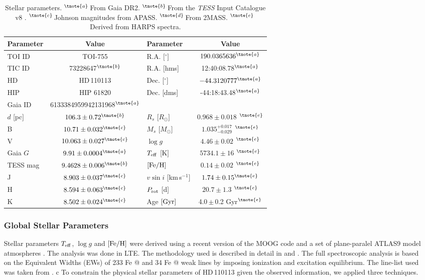 \documentclass[fleqn,usenatbib]{mnras}
\makeatletter
\newcommand*{\rom}[1]{\expandafter\@slowromancap\romannumeral #1@}
\newcommand{\tess}{{\it TESS}}
\newcommand{\harps}{{HARPS}}
\newcommand{\kms}{km\,s$^{-1}$}
\newcommand{\msun}{\mbox{$M_{\odot}$}}
\newcommand{\rsun}{\mbox{$R_{\odot}$}}
\newcommand{\vsini}{$v\sin{i}$}
\newcommand{\teff}{$T_{\rm eff}$}
\newcommand{\feh}{\mbox{$\rm [Fe/H]$}}
\newcommand{\logg}{$\log g$}
\newcommand{\Tlogg}{ $ 4.46 \pm 0.02 $ }
\newcommand{\TFeH}{ $ 0.14 \pm 0.02 $ }
\newcommand{\TTeff}{ $ 5734.1 \pm 16 $ }
\newcommand{\Tmassiso}{ $ 1.035^{+0.017}_{-0.029} $ }
\newcommand{\Trstar}{ $ 0.968 \pm 0.018 $ }
\newcommand{\Tperiod}{ $ 20.7 \pm 1.3 $ }
\newcommand{\TTstar}{TOI-755}
\newcommand{\Tstar}{HD\,110113}
\newcommand{\Tstarage}{4.0\,$\pm$\,0.2 Gyr}
\newcommand{\TGAIAid}{6133384959942131968}
\makeatother
\begin{document}
\begin{table}
    \centering
    \begin{tabular}{lc|lc}
        \hline
        \hline
        Parameter & Value & Parameter & Value \\
        \hline
        \hline
        TOI ID & \TTstar & R.A. [$^{\circ}$] & $190.0365636^{\tnote{a}}$ \\
        TIC ID & 73228647$^{\tnote{b}}$ & R.A. [hms] & 12:40:08.78$^{\tnote{a}}$ \\
        HD & \Tstar & Dec. [$^{\circ}$] & $-44.3120777^{\tnote{a}}$\\
        HIP & HIP 61820 & Dec. [dms] & -44:18:43.48$^{\tnote{a}}$ \\
        Gaia ID & {\scriptsize \TGAIAid}$^{\tnote{a}}$ & & \\
        $d$ [pc] & $ 106.3\pm0.72^{\tnote{b}}$ & $R_s$ [\rsun{}] & \Trstar{}$^{\tnote{e}}$ \\
        B & $10.71\pm0.032^{\tnote{c}}$ & $M_s$ [\msun{}] & \Tmassiso{}$^{\tnote{e}}$ \\
        V & $10.063\pm0.027^{\tnote{c}}$ &  \logg{} & \Tlogg{}$^{\tnote{e}}$ \\
        Gaia $G$ & $9.91\pm0.0004 ^{\tnote{a}}$ & \teff{} [K] & \TTeff{}$^{\tnote{e}}$ \\
        TESS mag & $9.4628\pm0.006^{\tnote{b}}$ & \feh{} & \TFeH{}$^{\tnote{e}}$ \\
        J & $8.903 \pm 0.037^{\tnote{c}}$ & \vsini{} [\kms{}]& $1.74\pm0.15^{\tnote{e}}$\\
        H & $8.594 \pm 0.063^{\tnote{c}}$ & $P_{\rm rot}$ [d] & \Tperiod{}$^{\tnote{e}}$\\
        K & $8.502 \pm0.024^{\tnote{c}}$ & Age $[{\rm Gyr}]$ & \Tstarage{}$^{\tnote{e}}$ \\
        \hline
        \hline
    \end{tabular}
    \caption{Stellar parameters.
    $^{\tnote{a}}$\,From Gaia DR2\citep{brown2018gaia}. $^{\tnote{b}}$\,From the \tess{} Input Catalogue v8 \citep{stassun2019revised}. $^{\tnote{c}}$\,Johnson magnitudes from APASS\citep{apass}. $^{\tnote{d}}$\,From 2MASS\citep{skrutskie2006two}. $^{\tnote{e}}$\,Derived from \harps{} spectra.}
    \label{tab:starpars}
\end{table}

\subsubsection{Global Stellar Parameters}\label{sect:starpars}
Stellar parameters \teff{}, \logg{} and \feh{} were derived using
a recent version of the MOOG code \citep{1973ApJ...184..839S} and a set of plane-paralel
ATLAS9 model atmospheres  \citep{Kurucz-93}. The analysis was done in LTE. 
The methodology used is described in detail in \citet{2011A&A...533A.141S} and \citet{2013A&A...556A.150S}. The full spectroscopic analysis is 
based on the Equivalent Widths (EWs) of 233 Fe \rom{1} and 34 Fe \rom{2} weak lines
by imposing ionization and excitation equilibrium. The line-list used
was taken from \citet{2008A&A...487..373S}.
c
To constrain the physical stellar parameters of \Tstar{} given the observed information, we applied three techniques.
\end{document}
